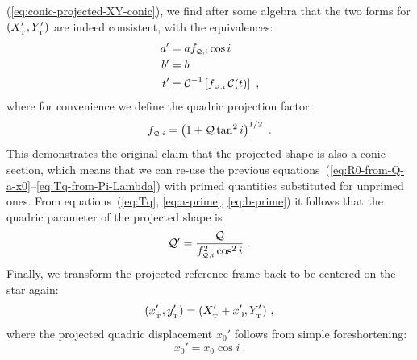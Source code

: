 (\ref{eq:conic-projected-XY-conic}), we find after some algebra that
the two forms for \((X_{_{\mathrm{\scriptscriptstyle T}}}', Y_{_{\mathrm{\scriptscriptstyle T}}}')\) are indeed consistent, with
the equivalences:
%
\newcommand\fQi{\ensuremath{f_{\scriptscriptstyle \Q,i}}}
\begin{align}
  \label{eq:a-prime}
  a' &= a \fQi \cos i  \\
  \label{eq:b-prime}
  b' &= b \\
  t' &= \Cos^{-1} \left[ \fQi \Cos(t) \right]  \ ,
\end{align}
where for convenience we define the quadric projection factor:
\begin{equation}
  \label{eq:fQi-factor}
  \fQi = \left( 1 + \Q \tan^2 i \right)^{1/2} \ .
\end{equation}
This demonstrates the original claim that the projected shape is also
a conic section, which means that we can re-use the previous
equations~(\ref{eq:R0-from-Q-a-x0}--\ref{eq:Tq-from-Pi-Lambda}) with
primed quantities substituted for unprimed ones.  From
equations~(\ref{eq:Tq}, \ref{eq:a-prime}, \ref{eq:b-prime}) it follows
that the quadric parameter of the projected shape is
\begin{equation}
  \label{eq:Q-prime}
  \Q' = \frac{ \Q } { \fQi^2 \cos^2 i} \ .
\end{equation}
Finally, we transform the projected reference frame back to be
centered on the star again:
\begin{equation}
  \label{eq:XYZ-xyz-prime}
  (x_{_{\mathrm{\scriptscriptstyle T}}}', y_{_{\mathrm{\scriptscriptstyle T}}}') = (X_{_{\mathrm{\scriptscriptstyle T}}}' + x_0', Y_{_{\mathrm{\scriptscriptstyle T}}}') \ , 
\end{equation}
where the projected quadric displacement \(x_0'\) follows from simple
foreshortening:
\begin{equation}
  \label{eq:x0-prime}
  x_0' = x_0 \cos i \ .
\end{equation}

